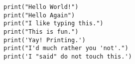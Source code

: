 \documentclass{article}
\begin{document}
\begin{lstlisting}
print("Hello World!")
print("Hello Again")
print("I like typing this.")
print("This is fun.")
print('Yay! Printing.')
print("I'd much rather you 'not'.")
print('I "said" do not touch this.')
\end{lstlisting}
\end{document}
